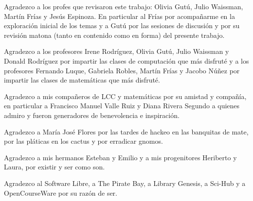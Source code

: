 Agradezco a los profes que revisaron este trabajo: Olivia Gutú, Julio Waissman, Martín Frías y Jesús Espinoza. En particular al Frías por acompañarme en la exploración inicial de los temas y a Gutú por las sesiones de discusión y por su revisión matona (tanto en contenido como en forma) del presente trabajo.

Agradezco a los profesores Irene Rodríguez, Olivia Gutú, Julio Waissman y Donald Rodríguez por impartir las clases de computación que más disfruté y a los profesores Fernando Luque, Gabriela Robles, Martín Frías y Jacobo Núñez por impartir las clases de matemáticas que más disfruté.

Agradezco a mis compañeros de LCC y matemáticas por su amistad y compañía, en particular a Francisco Manuel Valle Ruiz y Diana Rivera Segundo a quienes admiro y fueron generadores de benevolencia e inspiración.

Agradezco a María José Flores por las tardes de hackeo en las banquitas de mate, por las pláticas en los cactus y por erradicar gnomos.

Agradezco a mis hermanos Esteban y Emilio y a mis progenitores Heriberto y Laura, por existir y ser como son.

\bigskip

Agradezco al Software Libre, a The Pirate Bay, a Library Genesis, a Sci-Hub y a OpenCourseWare por su razón de ser.


